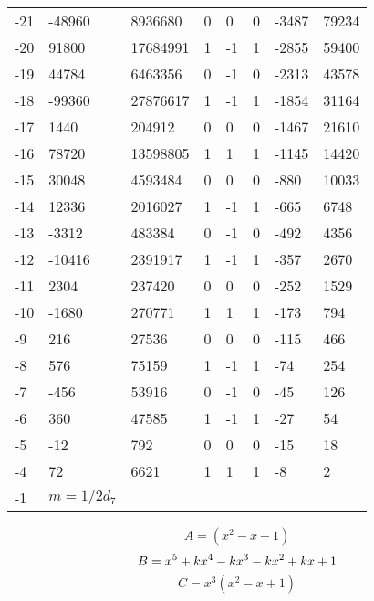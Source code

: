 \documentclass{amsart}
\begin{document}
\begin{longtable}{|l|l|l|lllll|}
-21&-48960&8936680&0&0&0&-3487&79234\\
-20&91800&17684991&1&-1&1&-2855&59400\\
-19&44784&6463356&0&-1&0&-2313&43578\\
-18&-99360&27876617&1&-1&1&-1854&31164\\
-17&1440&204912&0&0&0&-1467&21610\\
-16&78720&13598805&1&1&1&-1145&14420\\
-15&30048&4593484&0&0&0&-880&10033\\
-14&12336&2016027&1&-1&1&-665&6748\\
-13&-3312&483384&0&-1&0&-492&4356\\
-12&-10416&2391917&1&-1&1&-357&2670\\
-11&2304&237420&0&0&0&-252&1529\\
-10&-1680&270771&1&1&1&-173&794\\
-9&216&27536&0&0&0&-115&466\\
-8&576&75159&1&-1&1&-74&254\\
-7&-456&53916&0&-1&0&-45&126\\
-6&360&47585&1&-1&1&-27&54\\
-5&-12&792&0&0&0&-15&18\\
-4&72&6621&1&1&1&-8&2\\
-1&$m=1/2d_{7}$&&\multicolumn{5}{c|}{}\\
\hline
\end{longtable}
$$A=(x^2
 - x
 + 1)$$
$$B=x^5
 + k\*x^4
 - k\*x^3
 - k\*x^2
 + k\*x
 + 1$$
$$C=x^3(x^2
 - x
 + 1)$$
\end{document}
